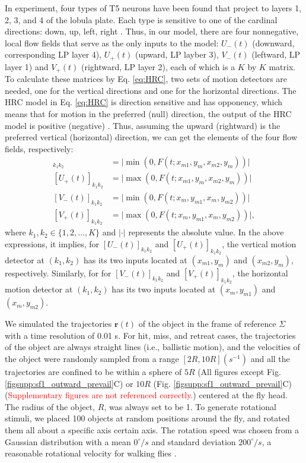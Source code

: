 \documentclass[9pt,lineno]{elife}
\begin{document}
In experiment, four types of T5 neurons have been found that project to layers 1, 2, 3, and 4 of the lobula plate. Each type is sensitive to one of the cardinal directions: down, up, left, right \citep{maisak2013directional}. Thus, in our model, there are four nonnegative, local flow fields that serve as the only inputs to the model: $U_{-}(t)$ (downward, corresponding LP layer 4), $U_{+}(t)$ (upward, LP layber 3), $V_{-}(t)$ (leftward, LP layer 1) and $V_{+}(t)$ (rightward, LP layer 2), each of which is a $K$ by $K$ matrix. To calculate these matrices by Eq. \ref{eq:HRC}, two sets of motion detectors are needed, one for the vertical directions and one for the horizontal directions. The HRC model in Eq. \ref{eq:HRC} is direction sensitive and has opponency, which means that for motion in the preferred (null) direction, the output of the HRC model is positive (negative) \citep{adelson1985spatiotemporal}. Thus, assuming the upward (rightward) is the preferred vertical (horizontal) direction, we can get the elements of the four flow fields, respectively:
\begin{align*}
[U_{-}(t)]_{k_{1}k_{2}} &= \lvert \min(0,F(t;x_{m1},y_{m},x_{m2},y_{m})) \rvert \nonumber \\
[U_{+}(t)]_{k_{1}k_{2}} &= \lvert \max(0,F(t;x_{m1},y_{m},x_{m2},y_{m})) \rvert \nonumber \\
[V_{-}(t)]_{k_{1}k_{2}} &= \lvert \min(0,F(t;x_{m},y_{m1},x_{m},y_{m2})) \rvert  \nonumber \\
[V_{+}(t)]_{k_{1}k_{2}} &= \lvert \max(0,F(t;x_{m},y_{m1},x_{m},y_{m2})) \rvert,
\end{align*}
where $k_{1},k_{2} \in \{1,2,\dots,K\}$ and $\lvert \cdot \rvert$ represents the absolute value. In the above expressions, it implies, for $[U_{-}(t)]_{k_{1}k_{2}}$ and $[U_{+}(t)]_{k_{1}k_{2}}$, the vertical motion detector at $(k_{1},k_{2})$ has its two inputs located at $(x_{m1},y_{m})$ and $(x_{m2},y_{m})$, respectively. Similarly, for for $[V_{-}(t)]_{k_{1}k_{2}}$ and $[V_{+}(t)]_{k_{1}k_{2}}$, the horizontal motion detector at $(k_{1},k_{2})$ has its two inputs located at $(x_{m},y_{m1})$ and $(x_{m},y_{m2})$.

We simulated the trajectories $\mathbf{r}(t)$ of the object in the frame of reference $\Sigma$ with a time resolution of 0.01 s. For hit, miss, and retreat cases, the trajectories of the object are always straight lines (i.e., ballistic motion), and the velocities of the object were randomly sampled from a range $[2R,10R](s^{-1})$ and all the trajectories are confined to be within a sphere of $5R$ (All figures except Fig. \ref{figsupp:sf1_outward_prevail}C) or $10R$ (Fig. \ref{figsupp:sf1_outward_prevail}C) (\textcolor{red}{Supplementary figures are not referenced correctly.}) centered at the fly head. The radius of the object, $R$, was always set to be 1. To generate rotational stimuli, we placed 100 objects at random positions around the fly, and rotated them all about a specific axis certain axis. The rotation speed was chosen from a Gaussian distribution with a mean $0^{\circ}/s$ and standard deviation $200^{\circ}/s$, a reasonable rotational velocity for walking flies \citep{deangelis2019manifold}.
\end{document}
